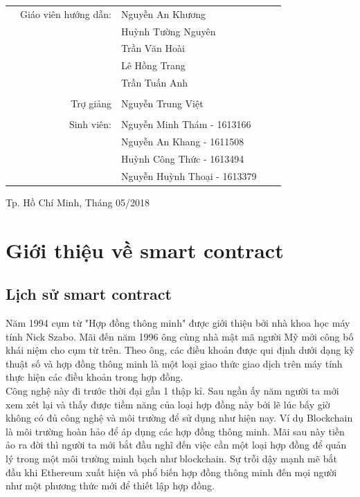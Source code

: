 \documentclass[12pt,a4paper,oneside]{article}
\begin{document}
\begin{titlepage}
\begin{table}[h]
	\begin{tabular}{rrlrr}
		\hspace{5cm} 
		& { Giáo viên hướng dẫn}: & { Nguyễn An Khương } & & \\
			&  & { Huỳnh Tường Nguyên } & & \\
		&  & { Trần Văn Hoài } & & \\
		&  & { Lê Hồng Trang } & & \\
				&  & { Trần Tuấn Anh } & & \\
				& & & &\\
			&{Trợ giảng} & Nguyễn Trung Việt & &\\
						& & & &\\
		& { Sinh viên}: & { Nguyễn Minh Thám - 1613166 } \\
		& & { Nguyễn An Khang - 1611508} \\

		& & { Huỳnh Công Thức - 1613494} \\
		& & { Nguyễn Huỳnh Thoại - 1613379} \\
		\end{tabular}
\end{table}

			

		\vspace{2cm}
		\begin{center}
			{\footnotesize Tp. Hồ Chí Minh, Tháng 05/2018}
		\end{center}
	\end{titlepage}
	
	\newpage
	\thispagestyle{empty}
	\tableofcontents
	
	\newpage
\setlength\parindent{0pt}

\section{Giới thiệu về smart contract}
\subsection{Lịch sử smart contract}
Năm 1994 cụm từ "Hợp đồng thông minh" được giới thiệu bởi nhà khoa học máy tính Nick Szabo. Mãi đến năm 1996 ông cùng nhà mật mã người Mỹ mới công bố khái niệm cho cụm từ trên. Theo ông, các điều khoản được qui định dưới dạng kỹ thuật số và hợp đồng thông minh là một loại giao thức giao dịch trên máy tính thực hiện các điều khoản trong hợp đồng.\\
Công nghệ này đi trước thời đại gần 1 thập kỉ. Sau ngần ấy năm người ta mới xem xét lại và thấy được tiềm năng của loại hợp đồng này bởi lẽ lúc bấy giờ không có đủ công nghệ và môi trường để sử dụng như hiện nay. Ví dụ Blockchain là môi trường hoàn hảo để áp dụng các hợp đồng thông minh. Mãi sau này tiền ảo ra đời thì người ta mới bắt đầu nghĩ đến việc cần một loại hợp đồng để quản lý trong một môi trường minh bạch như blockchain. Sự trỗi dậy mạnh mẽ bắt đầu khi Ethereum xuất hiện và phổ biến hợp đồng thông minh đến mọi người như một phương thức mới để thiết lập hợp đồng.
\end{document}
